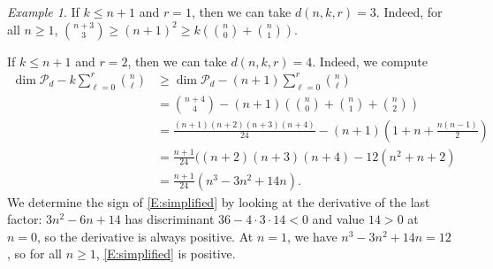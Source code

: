 \documentclass{amsart}
\newcommand{\Poly}{\mathscr{P}}
\newtheorem{proposition}[subsubsection]{Proposition}
\theoremstyle{definition}
\theoremstyle{remark}
\newtheorem{example}[subsubsection]{Example}
\begin{document}
\begin{example}
\label{Ex:poly-degree}
If $k \leq n + 1$ and $r = 1$, then we can take $d(n, k, r) = 3$. Indeed, for all $n \geq 1$, $\binom{n + 3}{3} \geq (n + 1)^2 \geq k (\binom{n}{0} + \binom{n}{1})$.

If $k \leq n + 1$ and $r = 2$, then we can take $d(n, k, r) = 4$. Indeed, we compute
\begin{align}
\dim \Poly_d - k \sum_{\ell = 0}^r \binom{n}{\ell} & \geq \dim \Poly_d - (n + 1) \sum_{\ell = 0}^r \binom{n}{\ell} \\
& = \binom{n + 4}{4} - (n + 1)(\binom{n}{0} + \binom{n}{1} + \binom{n}{2}) \\
&= \frac{(n + 1)(n + 2)(n + 3)(n + 4)}{24} - (n + 1)(1 + n + \frac{n (n - 1)}{2}) \\
& = \frac{n + 1}{24} ((n + 2)(n + 3)(n + 4) - 12 (n^2 + n + 2) \\
& = \frac{n + 1}{24} (n^3 - 3n^2 + 14n). \label{E:simplified}
\end{align}
We determine the sign of \eqref{E:simplified} by looking at the derivative of the last factor: $3n^2 - 6n + 14$ has discriminant $36 - 4 \cdot 3 \cdot 14 < 0$ and value $14 > 0$ at $n = 0$, so the derivative is always positive. At $n = 1$, we have $n^3 - 3n^2 + 14n = 12$, so for all $n \geq 1$, \eqref{E:simplified} is positive.
\end{example}
%
%
\end{document}
